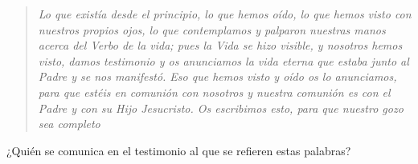 \blockquote[][\,(1 Jn 1-4)]{\emph{Lo que existía desde el principio, lo que hemos oído, lo que hemos visto con nuestros propios ojos, lo que contemplamos y palparon nuestras manos acerca del Verbo de la vida; pues la Vida se hizo visible, y nosotros hemos visto, damos testimonio y os anunciamos la vida eterna que estaba junto al Padre y se nos manifestó. Eso que hemos visto y oído os lo anunciamos, para que estéis en comunión con nosotros y nuestra comunión es con el Padre y con su Hijo Jesucristo. Os escribimos esto, para que nuestro gozo sea completo}}.
¿Quién se comunica en el testimonio al que se refieren estas palabras?
